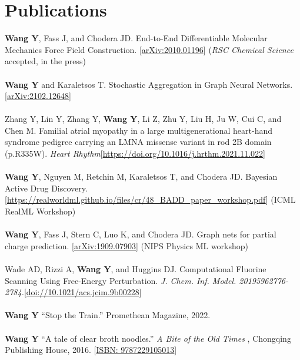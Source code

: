 \documentclass[letterpaper,10pt]{article}
\begin{document}
\section{Publications}
\textbf{Wang Y}, Fass J, and Chodera JD. End-to-End Differentiable Molecular Mechanics Force Field Construction. [\url{arXiv:2010.01196}] (\textit{RSC Chemical Science} accepted, in the press) \\\\
\textbf{Wang Y} and Karaletsos T. Stochastic Aggregation in Graph Neural Networks. [\url{arXiv:2102.12648}] \\\\
Zhang Y, Lin Y, Zhang Y, \textbf{Wang Y}, Li Z, Zhu Y, Liu H, Ju W, Cui C, and Chen M. Familial atrial myopathy in a large multigenerational heart-hand syndrome pedigree carrying an LMNA missense variant in rod 2B domain (p.R335W). \textit{Heart Rhythm}[\url{https://doi.org/10.1016/j.hrthm.2021.11.022}]\\\\
\textbf{Wang Y}, Nguyen M, Retchin M, Karaletsos T, and Chodera JD. Bayesian Active Drug Discovery. [\url{https://realworldml.github.io/files/cr/48_BADD_paper_workshop.pdf}] (ICML RealML Workshop)\\\\
\textbf{Wang Y}, Fass J, Stern C, Luo K, and Chodera JD. Graph nets for partial charge prediction. [\url{arXiv:1909.07903}] (NIPS Physics ML workshop)\\\\
Wade AD, Rizzi A, \textbf{Wang Y}, and Huggins DJ. Computational Fluorine Scanning Using Free-Energy Perturbation. \textit{J. Chem. Inf. Model. 20195962776-2784.}[\url{doi://10.1021/acs.jcim.9b00228}]\\\\
\textbf{Wang Y} ``Stop the Train.'' Promethean Magazine, 2022.\\\\
\textbf{Wang Y} ``A tale of clear broth noodles.'' \textit{A Bite of the Old Times }, Chongqing Publishing House, 2016. [\url{ISBN: 9787229105013}]


\end{document}
